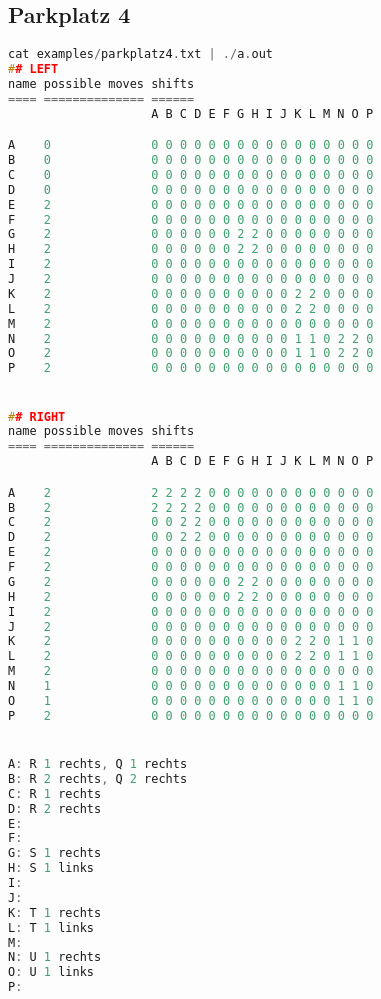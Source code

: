 \documentclass[a4paper,10pt,ngerman]{scrartcl}
\begin{document}
\subsection*{Parkplatz 4}
\begin{lstlisting}[language=C++]
cat examples/parkplatz4.txt | ./a.out
## LEFT
name possible moves shifts
==== ============== ======
                    A B C D E F G H I J K L M N O P

A    0              0 0 0 0 0 0 0 0 0 0 0 0 0 0 0 0
B    0              0 0 0 0 0 0 0 0 0 0 0 0 0 0 0 0
C    0              0 0 0 0 0 0 0 0 0 0 0 0 0 0 0 0
D    0              0 0 0 0 0 0 0 0 0 0 0 0 0 0 0 0
E    2              0 0 0 0 0 0 0 0 0 0 0 0 0 0 0 0
F    2              0 0 0 0 0 0 0 0 0 0 0 0 0 0 0 0
G    2              0 0 0 0 0 0 2 2 0 0 0 0 0 0 0 0
H    2              0 0 0 0 0 0 2 2 0 0 0 0 0 0 0 0
I    2              0 0 0 0 0 0 0 0 0 0 0 0 0 0 0 0
J    2              0 0 0 0 0 0 0 0 0 0 0 0 0 0 0 0
K    2              0 0 0 0 0 0 0 0 0 0 2 2 0 0 0 0
L    2              0 0 0 0 0 0 0 0 0 0 2 2 0 0 0 0
M    2              0 0 0 0 0 0 0 0 0 0 0 0 0 0 0 0
N    2              0 0 0 0 0 0 0 0 0 0 1 1 0 2 2 0
O    2              0 0 0 0 0 0 0 0 0 0 1 1 0 2 2 0
P    2              0 0 0 0 0 0 0 0 0 0 0 0 0 0 0 0


## RIGHT
name possible moves shifts
==== ============== ======
                    A B C D E F G H I J K L M N O P

A    2              2 2 2 2 0 0 0 0 0 0 0 0 0 0 0 0
B    2              2 2 2 2 0 0 0 0 0 0 0 0 0 0 0 0
C    2              0 0 2 2 0 0 0 0 0 0 0 0 0 0 0 0
D    2              0 0 2 2 0 0 0 0 0 0 0 0 0 0 0 0
E    2              0 0 0 0 0 0 0 0 0 0 0 0 0 0 0 0
F    2              0 0 0 0 0 0 0 0 0 0 0 0 0 0 0 0
G    2              0 0 0 0 0 0 2 2 0 0 0 0 0 0 0 0
H    2              0 0 0 0 0 0 2 2 0 0 0 0 0 0 0 0
I    2              0 0 0 0 0 0 0 0 0 0 0 0 0 0 0 0
J    2              0 0 0 0 0 0 0 0 0 0 0 0 0 0 0 0
K    2              0 0 0 0 0 0 0 0 0 0 2 2 0 1 1 0
L    2              0 0 0 0 0 0 0 0 0 0 2 2 0 1 1 0
M    2              0 0 0 0 0 0 0 0 0 0 0 0 0 0 0 0
N    1              0 0 0 0 0 0 0 0 0 0 0 0 0 1 1 0
O    1              0 0 0 0 0 0 0 0 0 0 0 0 0 1 1 0
P    2              0 0 0 0 0 0 0 0 0 0 0 0 0 0 0 0


A: R 1 rechts, Q 1 rechts
B: R 2 rechts, Q 2 rechts
C: R 1 rechts
D: R 2 rechts
E:
F:
G: S 1 rechts
H: S 1 links
I:
J:
K: T 1 rechts
L: T 1 links
M:
N: U 1 rechts
O: U 1 links
P:
\end{lstlisting}
\end{document}
